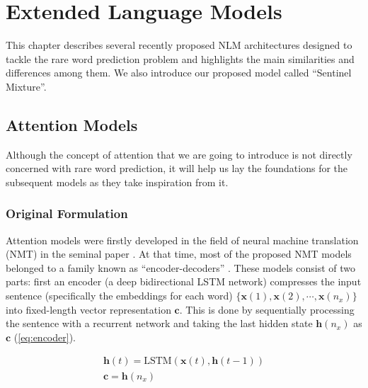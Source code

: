 \chapter{Extended Language Models}

This chapter describes several recently proposed NLM architectures designed to tackle the rare word prediction problem and highlights the main similarities and differences among them. We also introduce our proposed model called ``Sentinel Mixture''.


\section{Attention Models}
\label{sec:attention}

Although the concept of attention that we are going to introduce is not directly concerned with rare word prediction, it will help us lay the foundations for the subsequent models as they take inspiration from it.

\subsection{Original Formulation}

Attention models were firstly developed in the field of neural machine translation (NMT) in the seminal paper \cite{bahdanau2014neural}. At that time, most of the proposed NMT models belonged to a family known as ``encoder-decoders'' \cite{sutskever2014sequence}. These models consist of two parts: first an encoder (a deep bidirectional LSTM network) compresses the input sentence (specifically the embeddings for each word) $\{\mathbf{x}(1), \mathbf{x}(2), \cdots, \mathbf{x}(n_x)\}$ into fixed-length vector representation $\mathbf{c}$. This is done by sequentially processing the sentence with a recurrent network and taking the last hidden state $\mathbf{h}(n_x)$ as $\mathbf{c}$ (\autoref{eq:encoder}).

\begin{equation} \label{eq:encoder}
	\begin{gathered}
		\mathbf{h}(t) = \text{LSTM}(\mathbf{x}(t), \mathbf{h}(t-1)) \\
		\mathbf{c} = \mathbf{h}(n_x)
	\end{gathered}
\end{equation}

